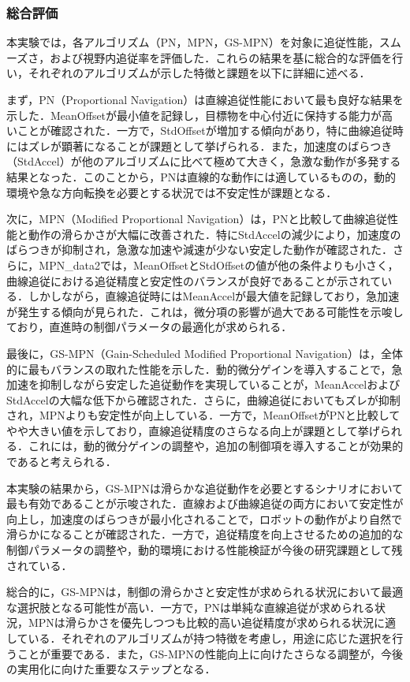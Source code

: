 \subsubsection{総合評価}
本実験では，各アルゴリズム（PN，MPN，GS-MPN）を対象に追従性能，スムーズさ，および視野内追従率を評価した．これらの結果を基に総合的な評価を行い，それぞれのアルゴリズムが示した特徴と課題を以下に詳細に述べる．

まず，PN（Proportional Navigation）は直線追従性能において最も良好な結果を示した．MeanOffsetが最小値を記録し，目標物を中心付近に保持する能力が高いことが確認された．一方で，StdOffsetが増加する傾向があり，特に曲線追従時にはズレが顕著になることが課題として挙げられる．また，加速度のばらつき（StdAccel）が他のアルゴリズムに比べて極めて大きく，急激な動作が多発する結果となった．このことから，PNは直線的な動作には適しているものの，動的環境や急な方向転換を必要とする状況では不安定性が課題となる．

次に，MPN（Modified Proportional Navigation）は，PNと比較して曲線追従性能と動作の滑らかさが大幅に改善された．特にStdAccelの減少により，加速度のばらつきが抑制され，急激な加速や減速が少ない安定した動作が確認された．さらに，MPN\_data2では，MeanOffsetとStdOffsetの値が他の条件よりも小さく，曲線追従における追従精度と安定性のバランスが良好であることが示されている．しかしながら，直線追従時にはMeanAccelが最大値を記録しており，急加速が発生する傾向が見られた．これは，微分項の影響が過大である可能性を示唆しており，直進時の制御パラメータの最適化が求められる．

最後に，GS-MPN（Gain-Scheduled Modified Proportional Navigation）は，全体的に最もバランスの取れた性能を示した．動的微分ゲインを導入することで，急加速を抑制しながら安定した追従動作を実現していることが，MeanAccelおよびStdAccelの大幅な低下から確認された．さらに，曲線追従においてもズレが抑制され，MPNよりも安定性が向上している．一方で，MeanOffsetがPNと比較してやや大きい値を示しており，直線追従精度のさらなる向上が課題として挙げられる．これには，動的微分ゲインの調整や，追加の制御項を導入することが効果的であると考えられる．

本実験の結果から，GS-MPNは滑らかな追従動作を必要とするシナリオにおいて最も有効であることが示唆された．直線および曲線追従の両方において安定性が向上し，加速度のばらつきが最小化されることで，ロボットの動作がより自然で滑らかになることが確認された．一方で，追従精度を向上させるための追加的な制御パラメータの調整や，動的環境における性能検証が今後の研究課題として残されている．

総合的に，GS-MPNは，制御の滑らかさと安定性が求められる状況において最適な選択肢となる可能性が高い．一方で，PNは単純な直線追従が求められる状況，MPNは滑らかさを優先しつつも比較的高い追従精度が求められる状況に適している．それぞれのアルゴリズムが持つ特徴を考慮し，用途に応じた選択を行うことが重要である．また，GS-MPNの性能向上に向けたさらなる調整が，今後の実用化に向けた重要なステップとなる．
